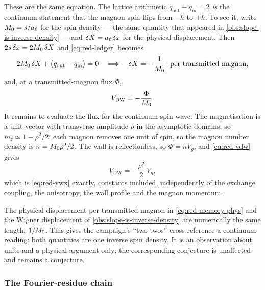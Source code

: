 These are the same equation. The lattice arithmetic
$q_{\mathrm{out}}-q_{\mathrm{in}}=2$ \emph{is} the continuum statement that the
magnon spin flips from $-\hbar$ to $+\hbar$. To see it, write $M_{0}=s/a_{\ell}$
for the spin density --- the same quantity that appeared in
\cref{obs:slope-is-inverse-density} --- and $\delta X=a_{\ell}\,\delta x$ for
the physical displacement. Then $2s\,\delta x=2M_{0}\,\delta X$ and
\eqref{eq:red-ledger} becomes
\begin{equation}
  2M_{0}\,\delta X+\bigl(q_{\mathrm{out}}-q_{\mathrm{in}}\bigr)=0
  \quad\Longrightarrow\quad
  \delta X=-\frac{1}{M_{0}}\ \ \text{per transmitted magnon},
  \label{eq:red-memory-phys}
\end{equation}
and, at a transmitted-magnon flux $\Phi$,
\begin{equation}
  V_{\mathrm{DW}}=-\frac{\Phi}{M_{0}} .
  \label{eq:red-vdw}
\end{equation}
It remains to evaluate the flux for the continuum spin wave. The magnetisation
is a unit vector with transverse amplitude $\rho$ in the asymptotic domains, so
$m_z\simeq1-\rho^2/2$; each magnon removes one unit of spin, so the magnon
number density is $n=M_{0}\rho^2/2$. The wall is reflectionless, so
$\Phi=nV_g$, and \eqref{eq:red-vdw} gives
\begin{equation}
  V_{\mathrm{DW}}=-\frac{\rho^2}{2}\,V_g,
\end{equation}
which is \eqref{eq:red-ywx} exactly, constants included, independently of the
exchange coupling, the anisotropy, the wall profile and the magnon momentum.

\begin{remark}
\label{rem:two-twos-continuum}
The physical displacement per transmitted magnon in
\eqref{eq:red-memory-phys} and the Wigner displacement of
\cref{obs:slope-is-inverse-density} are numerically the same length,
$1/M_{0}$. This gives the campaign's ``two twos'' cross-reference a
continuum reading: both quantities are one inverse spin density. It is an
observation about units and a physical argument only; the corresponding
conjecture is unaffected and remains a conjecture.
\end{remark}

\subsubsection*{The Fourier-residue chain}

